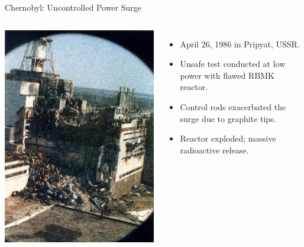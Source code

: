\documentclass{beamer}
\begin{document}
\begin{frame}{Chernobyl: Uncontrolled Power Surge}
  \begin{columns}
  \includegraphics[width=\textwidth]{chernobylafter.jpg}
  \begin{itemize}
    \item April 26, 1986 in Pripyat, USSR.
    \item Unsafe test conducted at low power with flawed RBMK reactor.
    \item Control rods exacerbated the surge due to graphite tips.
    \item Reactor exploded; massive radioactive release.
  \end{itemize}


\end{columns}
\end{frame}
\end{document}
